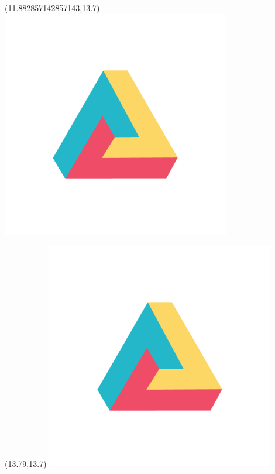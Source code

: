 \documentclass[22pt]{beamer}
\begin{document}
\begin{frame}[fragile]
\begin{textblock}{2}
\end{textblock}
\begin{textblock}{2}(11.882857142857143,13.7)
\includegraphics[height=10cm]{dh.png}
\end{textblock}
\begin{textblock}{2}(13.79,13.7)
\includegraphics[height=10cm]{dh.png}
\end{textblock}

\end{frame}
\end{document}
